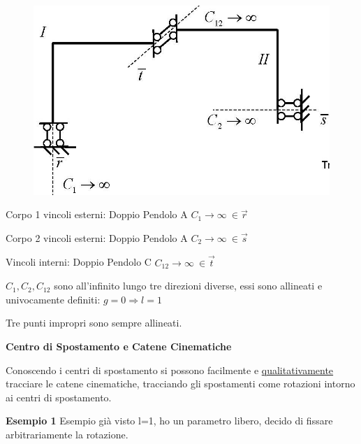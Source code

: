 \documentclass{article}
\begin{document}
\begin{adjustwidth}{2in}{}
\begin{enumerate}
\begin{figure}[H]
	\centering
	\includegraphics[width=0.4\linewidth]{immagini/1.PARTE3_Pagina_17}
\end{figure}
Corpo 1 vincoli esterni: Doppio Pendolo A $C_{1} \rightarrow \infty ~ \in \vec{r}$ \newline

Corpo 2 vincoli esterni: Doppio Pendolo A $C_{2} \rightarrow \infty ~ \in \vec{s}$ \newline

Vincoli interni: Doppio Pendolo C $C_{12} \rightarrow \infty ~ \in \vec{t}$\newline

$C_1, C_2, C_{12}$ sono all'infinito lungo tre direzioni diverse, essi sono allineati e univocamente definiti: $g=0 \Rightarrow l=1$ \newline

Tre punti impropri sono sempre allineati. \newline

\end{enumerate}

{\Large \textbf{Centro di Spostamento e Catene Cinematiche}} \mbox{} \newline

Conoscendo i centri di spostamento si possono facilmente e \underline{qualitativamente} tracciare le catene cinematiche, tracciando gli spostamenti come rotazioni intorno ai centri di spostamento. \newline

\textbf{Esempio 1} \newline
Esempio già visto l=1, ho un parametro libero, decido di fissare arbitrariamente la rotazione.


\end{adjustwidth}
\end{document}
